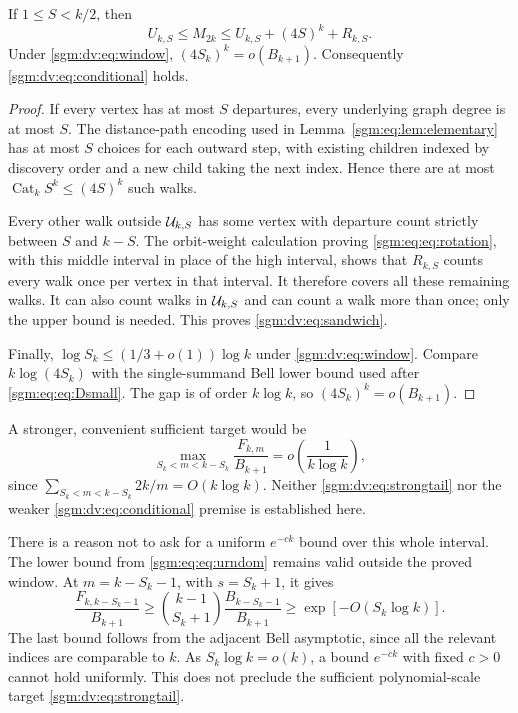 \documentclass[11pt,letterpaper]{article}
\theoremstyle{remark}\newtheorem{remark}[theorem]{Remark}
\newcommand{\Cat}{\operatorname{Cat}}\newcommand{\E}{\mathbb E}\newcommand{\Prob}{\mathbb P}\newcommand{\ind}{\mathbf 1}
\theoremstyle{definition}\newtheorem{definition}[theorem]{Definition}
\begin{document}
\begin{proposition}\label{sgm:dv:prop:tail}
If $1\le S<k/2$, then
\begin{equation}\label{sgm:dv:eq:sandwich}
 U_{k,S}\le M_{2k}\le U_{k,S}+(4S)^k+R_{k,S}.
\end{equation}
Under \eqref{sgm:dv:eq:window}, $(4S_k)^k=o(B_{k+1})$. Consequently \eqref{sgm:dv:eq:conditional} holds.
\end{proposition}
\begin{proof}
If every vertex has at most $S$ departures, every underlying graph degree is at most $S$. The distance-path encoding used in Lemma~\ref{sgm:eq:lem:elementary} has at most $S$ choices for each outward step, with existing children indexed by discovery order and a new child taking the next index. Hence there are at most $\Cat_kS^k\le(4S)^k$ such walks.

Every other walk outside $\mathcal U_{k,S}$ has some vertex with departure count strictly between $S$ and $k-S$. The orbit-weight calculation proving \eqref{sgm:eq:eq:rotation}, with this middle interval in place of the high interval, shows that $R_{k,S}$ counts every walk once per vertex in that interval. It therefore covers all these remaining walks. It can also count walks in $\mathcal U_{k,S}$ and can count a walk more than once; only the upper bound is needed. This proves \eqref{sgm:dv:eq:sandwich}.

Finally, $\log S_k\le(1/3+o(1))\log k$ under \eqref{sgm:dv:eq:window}. Compare $k\log(4S_k)$ with the single-summand Bell lower bound used after \eqref{sgm:eq:eq:Dsmall}. The gap is of order $k\log k$, so $(4S_k)^k=o(B_{k+1})$.
\end{proof}

A stronger, convenient sufficient target would be
\begin{equation}\label{sgm:dv:eq:strongtail}
 \max_{S_k<m<k-S_k}\frac{F_{k,m}}{B_{k+1}}
       =o\left(\frac1{k\log k}\right),
\end{equation}
since $\sum_{S_k<m<k-S_k}2k/m=O(k\log k)$. Neither \eqref{sgm:dv:eq:strongtail} nor the weaker \eqref{sgm:dv:eq:conditional} premise is established here.

There is a reason not to ask for a uniform $e^{-ck}$ bound over this whole interval. The lower bound from \eqref{sgm:eq:eq:urndom} remains valid outside the proved window. At $m=k-S_k-1$, with $s=S_k+1$, it gives
\[
 \frac{F_{k,k-S_k-1}}{B_{k+1}}
 \ge \binom{k-1}{S_k+1}\frac{B_{k-S_k-1}}{B_{k+1}}
 \ge \exp[-O(S_k\log k)].
\]
The last bound follows from the adjacent Bell asymptotic, since all the relevant indices are comparable to $k$. As $S_k\log k=o(k)$, a bound $e^{-ck}$ with fixed $c>0$ cannot hold uniformly. This does not preclude the sufficient polynomial-scale target \eqref{sgm:dv:eq:strongtail}.
\end{document}
